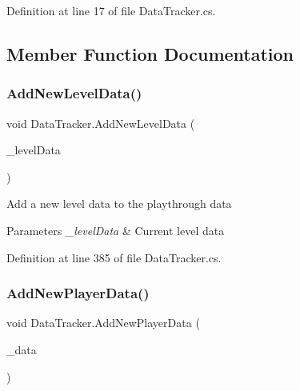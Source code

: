 Definition at line 17 of file Data\+Tracker.\+cs.



\subsection{Member Function Documentation}
\mbox{\label{class_data_tracker_ad8d42a698f0dc7bfa12d5200e158d0a4}} 
\subsubsection{\texorpdfstring{Add\+New\+Level\+Data()}{AddNewLevelData()}}
{\footnotesize\ttfamily void Data\+Tracker.\+Add\+New\+Level\+Data (\begin{DoxyParamCaption}\item[{ref \mbox{\hyperlink{class_design_data}{Design\+Data}}}]{\+\_\+level\+Data }\end{DoxyParamCaption})}



Add a new level data to the playthrough data 


\begin{DoxyParams}{Parameters}
{\em \+\_\+level\+Data} & Current level data\\
\hline
\end{DoxyParams}


Definition at line 385 of file Data\+Tracker.\+cs.

\mbox{\label{class_data_tracker_a385ec3ae6529d79a33932e3c759ec2b5}} 
\subsubsection{\texorpdfstring{Add\+New\+Player\+Data()}{AddNewPlayerData()}}
{\footnotesize\ttfamily void Data\+Tracker.\+Add\+New\+Player\+Data (\begin{DoxyParamCaption}\item[{ref \mbox{\hyperlink{struct_player_data}{Player\+Data}}}]{\+\_\+data }\end{DoxyParamCaption})}



